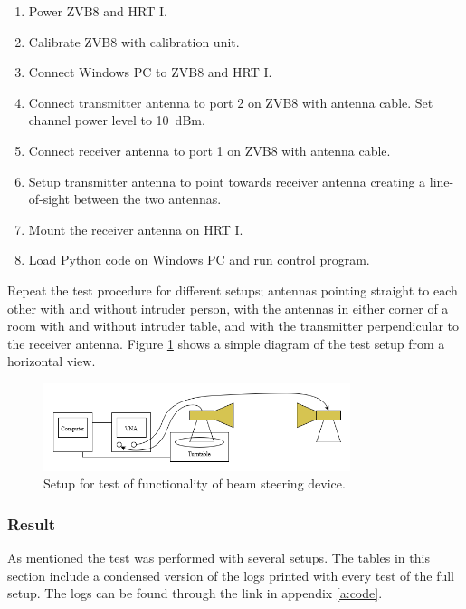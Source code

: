 \begin{enumerate}
    \item Power ZVB8 and HRT I. 
    \item Calibrate ZVB8 with calibration unit.
    \item Connect Windows PC to ZVB8 and HRT I.
    \item Connect transmitter antenna to port 2 on ZVB8 with antenna cable. Set channel power level to \SI{10}{dBm}.
    \item Connect receiver antenna to port 1 on ZVB8 with antenna cable.
    \item Setup transmitter antenna to point towards receiver antenna creating a line-of-sight between the two antennas. 
    \item Mount the receiver antenna on HRT I.
    \item Load Python code on Windows PC and run control program.
\end{enumerate}

Repeat the test procedure for different setups; antennas pointing straight to each other with and without intruder person, with the antennas in either corner of a room with and without intruder table, and with the transmitter perpendicular to the receiver antenna. Figure \ref{fig:experiment-setup} shows a simple diagram of the test setup from a horizontal view.

\begin{figure}[H]
    \centering
    \includegraphics[width=0.8\textwidth]{figures/accept_test_setup.png}
    \caption{Setup for test of functionality of beam steering device.} \label{fig:experiment-setup}
\end{figure}

\subsubsection{Result}
As mentioned the test was performed with several setups. The tables in this section include a condensed version of the logs printed with every test of the full setup. The logs can be found through the link in appendix \ref{a:code}. 

